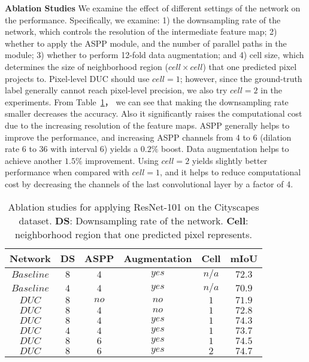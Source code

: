 \documentclass[10pt,twocolumn,letterpaper]{article}
\begin{document}
\textbf{Ablation Studies}
We examine the effect of different settings of the network on the performance. Specifically, we examine: 1) the downsampling rate of the network, which controls the resolution of the intermediate feature map; 2) whether to apply the ASPP module, and the number of parallel paths in the module; 3) whether to perform 12-fold data augmentation; and 4) cell size, which determines the size of neighborhood region ($cell\times cell$) that one predicted pixel projects to. Pixel-level DUC should use  $cell=1$; however, since the ground-truth label generally cannot reach pixel-level precision, we also try $cell=2$ in the experiments. From Table~\ref{table_1}， we can see that making the downsampling rate smaller decreases the accuracy. Also it significantly raises the computational cost due to the increasing resolution of the feature maps. ASPP generally helps to improve the performance, and increasing ASPP channels from 4 to 6 (dilation rate 6 to 36 with interval 6) yields a $0.2\%$ boost. Data augmentation helps to achieve another $1.5\%$ improvement. Using $cell=2$ yields slightly better performance when compared with $cell=1$, and it helps to reduce computational cost by decreasing the channels of the last convolutional layer by a factor of 4.

\begin{table}[ht]
\begin{center}
\begin{tabular}{ccccc|c} \toprule[1.5pt]{Network}      &     {DS}   & {ASPP}  &  {Augmentation} & {Cell} &{mIoU}\\ \midrule
   $Baseline$  &     $8$    &  $4$    &  $yes$  & $n/a$ & $72.3$ \\
   $Baseline$  &     $4$    &  $4$    &  $yes$  & $n/a$ & $70.9$ \\ \midrule
   $DUC$  &     	 $8$    &  $no$   &  $no$  &  $1$ & $71.9$ \\
   $DUC$  &    	     $8$    &  $4$    &  $no$  &  $1$ & $72.8$ \\
   $DUC$  &    	     $8$    &  $4$    &  $yes$  & $1$ & $74.3$ \\
   $DUC$  &     	 $4$    &  $4$    &  $yes$  & $1$ & $73.7$ \\ 
   $DUC$  &     	 $8$    &  $6$    &  $yes$  & $1$ & $74.5$ \\
   $DUC$  &     	 $8$    &  $6$    &  $yes$  & $2$ & $74.7$ \\ \bottomrule[1.5pt]
\end{tabular}
\vspace{3pt}
\caption{Ablation studies for applying ResNet-101 on the Cityscapes dataset. \textbf{DS}: Downsampling rate of the network.  \textbf{Cell}: neighborhood region that one predicted pixel represents.}
\label{table_1} 
\end{center}
\vspace{-15pt}
\end{table}
\end{document}
